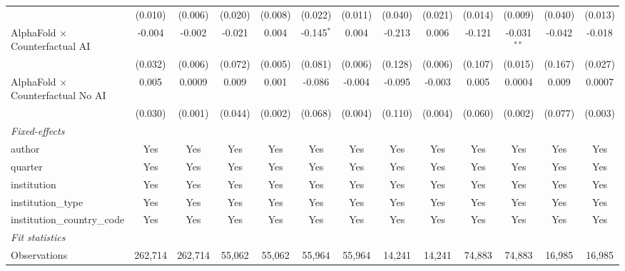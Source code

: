 \begin{tabular}{lcccccccccccc}
                                            & (0.010)      & (0.006) & (0.020) & (0.008) & (0.022)       & (0.011) & (0.040)     & (0.021) & (0.014)      & (0.009)       & (0.040) & (0.013)\\   
   AlphaFold $\times$ Counterfactual AI     & -0.004       & -0.002  & -0.021  & 0.004   & -0.145$^{*}$  & 0.004   & -0.213      & 0.006   & -0.121       & -0.031$^{**}$ & -0.042  & -0.018\\   
                                            & (0.032)      & (0.006) & (0.072) & (0.005) & (0.081)       & (0.006) & (0.128)     & (0.006) & (0.107)      & (0.015)       & (0.167) & (0.027)\\   
   AlphaFold $\times$ Counterfactual No AI  & 0.005        & 0.0009  & 0.009   & 0.001   & -0.086        & -0.004  & -0.095      & -0.003  & 0.005        & 0.0004        & 0.009   & 0.0007\\   
                                            & (0.030)      & (0.001) & (0.044) & (0.002) & (0.068)       & (0.004) & (0.110)     & (0.004) & (0.060)      & (0.002)       & (0.077) & (0.003)\\   
   \midrule
   \emph{Fixed-effects}\\
   author                                   & Yes          & Yes     & Yes     & Yes     & Yes           & Yes     & Yes         & Yes     & Yes          & Yes           & Yes     & Yes\\  
   quarter                                  & Yes          & Yes     & Yes     & Yes     & Yes           & Yes     & Yes         & Yes     & Yes          & Yes           & Yes     & Yes\\  
   institution                              & Yes          & Yes     & Yes     & Yes     & Yes           & Yes     & Yes         & Yes     & Yes          & Yes           & Yes     & Yes\\  
   institution\_type                        & Yes          & Yes     & Yes     & Yes     & Yes           & Yes     & Yes         & Yes     & Yes          & Yes           & Yes     & Yes\\  
   institution\_country\_code               & Yes          & Yes     & Yes     & Yes     & Yes           & Yes     & Yes         & Yes     & Yes          & Yes           & Yes     & Yes\\  
   \midrule
   \emph{Fit statistics}\\
   Observations                             & 262,714      & 262,714 & 55,062  & 55,062  & 55,964        & 55,964  & 14,241      & 14,241  & 74,883       & 74,883        & 16,985  & 16,985\\  

\end{tabular}
